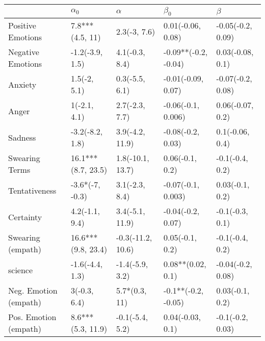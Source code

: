 \begin{tabular}{lllll}
\toprule
{} &          $\alpha_0$ &           $\alpha$ &             $\beta_0$ &            $\beta$ \\
\midrule
Positive Emotions     &     7.8***(4.5, 11) &       2.3(-3, 7.6) &     0.01(-0.06, 0.08) &  -0.05(-0.2, 0.09) \\
Negative Emotions     &     -1.2(-3.9, 1.5) &     4.1(-0.3, 8.4) &  -0.09**(-0.2, -0.04) &   0.03(-0.08, 0.1) \\
Anxiety               &        1.5(-2, 5.1) &     0.3(-5.5, 6.1) &    -0.01(-0.09, 0.07) &  -0.07(-0.2, 0.08) \\
Anger                 &        1(-2.1, 4.1) &     2.7(-2.3, 7.7) &    -0.06(-0.1, 0.006) &   0.06(-0.07, 0.2) \\
Sadness               &     -3.2(-8.2, 1.8) &    3.9(-4.2, 11.9) &     -0.08(-0.2, 0.03) &    0.1(-0.06, 0.4) \\
Swearing Terms        &  16.1***(8.7, 23.5) &   1.8(-10.1, 13.7) &       0.06(-0.1, 0.2) &    -0.1(-0.4, 0.2) \\
Tentativeness         &     -3.6*(-7, -0.3) &     3.1(-2.3, 8.4) &    -0.07(-0.1, 0.003) &    0.03(-0.1, 0.2) \\
Certainty             &      4.2(-1.1, 9.4) &    3.4(-5.1, 11.9) &     -0.04(-0.2, 0.07) &    -0.1(-0.3, 0.1) \\
Swearing (empath)     &  16.6***(9.8, 23.4) &  -0.3(-11.2, 10.6) &       0.05(-0.1, 0.2) &    -0.1(-0.4, 0.2) \\
science               &     -1.6(-4.4, 1.3) &    -1.4(-5.9, 3.2) &     0.08**(0.02, 0.1) &  -0.04(-0.2, 0.08) \\
Neg. Emotion (empath) &        3(-0.3, 6.4) &      5.7*(0.3, 11) &   -0.1**(-0.2, -0.05) &    0.03(-0.1, 0.2) \\
Pos. Emotion (empath) &   8.6***(5.3, 11.9) &    -0.1(-5.4, 5.2) &      0.04(-0.03, 0.1) &   -0.1(-0.2, 0.03) \\
\bottomrule
\end{tabular}

